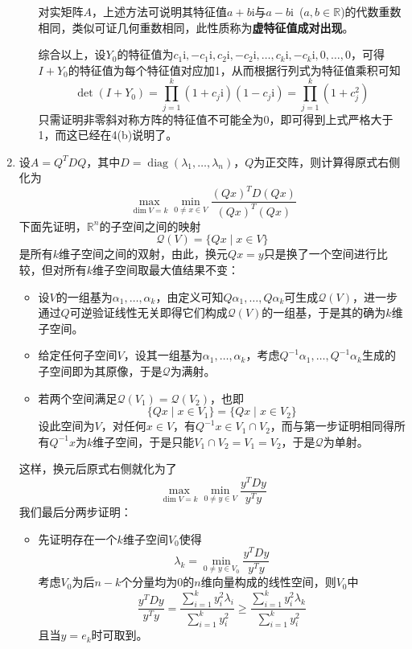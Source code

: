 \documentclass[a4paper,UTF8,fontset=windows]{ctexart}
\DeclareMathOperator{\diag}{diag}
\newcommand*{\ir}{\mathrm{i}}
\newcommand*{\note}{\noindent *}
\begin{document}
\begin{enumerate}
\begin{enumerate}
        \note 对实矩阵$A$，上述方法可说明其特征值$a+b\ir$与$a-b\ir$\ ($a,b\in\mathbb{R}$)的代数重数相同，类似可证几何重数相同，此性质称为\textbf{虚特征值成对出现}。

        综合以上，设$Y_0$的特征值为$c_1\ir,-c_1\ir,c_2\ir,-c_2\ir,\dots,c_k\ir,-c_k\ir,0,\dots,0$，可得$I+Y_0$的特征值为每个特征值对应加1，从而根据行列式为特征值乘积可知
        $$\det(I+Y_0)=\prod_{j=1}^k(1+c_j\ir)(1-c_j\ir)=\prod_{j=1}^k(1+c_j^2)$$
        只需证明非零斜对称方阵的特征值不可能全为0，即可得到上式严格大于1，而这已经在4(b)说明了。
    \end{enumerate}
    
    \item
    设$A=Q^TDQ$，其中$D=\diag(\lambda_1,\dots,\lambda_n)$，$Q$为正交阵，则计算得原式右侧化为
    $$\max_{\dim V=k}\min_{0\ne x\in V}\frac{(Qx)^TD(Qx)}{(Qx)^T(Qx)}$$
    下面先证明，$\mathbb{R}^n$的子空间之间的映射
    $$\mathcal{Q}(V)=\{Qx\mid x\in V\}$$
    是所有$k$维子空间之间的双射，由此，换元$Qx=y$只是换了一个空间进行比较，但对所有$k$维子空间取最大值结果不变：
    \begin{itemize}
        \item 设$V$的一组基为$\alpha_1,\dots,\alpha_k$，由定义可知$Q\alpha_1,\dots,Q\alpha_k$可生成$\mathcal{Q}(V)$，进一步通过$Q$可逆验证线性无关即得它们构成$\mathcal{Q}(V)$的一组基，于是其的确为$k$维子空间。
        \item 给定任何子空间$V$，设其一组基为$\alpha_1,\dots,\alpha_k$，考虑$Q^{-1}\alpha_1,\dots,Q^{-1}\alpha_k$生成的子空间即为其原像，于是$\mathcal{Q}$为满射。
        \item 若两个空间满足$\mathcal{Q}(V_1)=\mathcal{Q}(V_2)$，也即
        $$\{Qx\mid x\in V_1\}=\{Qx\mid x\in V_2\}$$
        设此空间为$V$，对任何$x\in V$，有$Q^{-1}x\in V_1\cap V_2$，而与第一步证明相同得所有$Q^{-1}x$为$k$维子空间，于是只能$V_1\cap V_2=V_1=V_2$，于是$\mathcal{Q}$为单射。
    \end{itemize}

    这样，换元后原式右侧就化为了
    $$\max_{\dim V=k}\min_{0\ne y\in V}\frac{y^TDy}{y^Ty}$$
    我们最后分两步证明：
    \begin{itemize}
        \item 先证明存在一个$k$维子空间$V_0$使得
        $$\lambda_k=\min_{0\ne y\in V_0}\frac{y^TDy}{y^Ty}$$
        考虑$V_0$为后$n-k$个分量均为0的$n$维向量构成的线性空间，则$V_0$中
        $$\frac{y^TDy}{y^Ty}=\frac{\sum_{i=1}^ky_i^2\lambda_i}{\sum_{i=1}^ky_i^2}\ge\frac{\sum_{i=1}^ky_i^2\lambda_k}{\sum_{i=1}^ky_i^2}$$
        且当$y=e_k$时可取到。


\end{itemize}
\end{enumerate}
\end{document}
